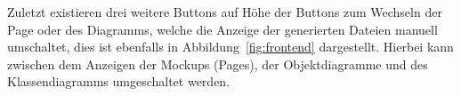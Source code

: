 
Zuletzt existieren drei weitere Buttons auf Höhe der Buttons zum Wechseln der Page oder des Diagramms, welche die Anzeige der generierten Dateien manuell umschaltet,
dies ist ebenfalls in Abbildung~\ref{fig:frontend} dargestellt.
Hierbei kann zwischen dem Anzeigen der Mockups (Pages), der Objektdiagramme und des Klassendiagramms umgeschaltet werden.

